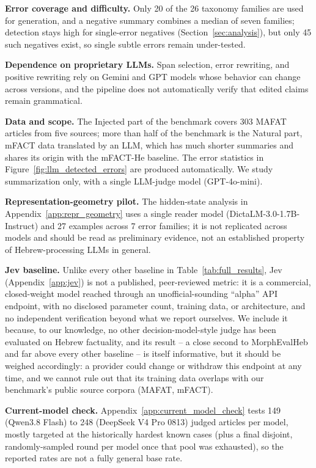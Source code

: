 \documentclass[11pt]{article}
\begin{document}
\textbf{Error coverage and difficulty.} Only 20 of the 26 taxonomy families are used for generation, and a negative summary combines a median of seven families; detection stays high for single-error negatives (Section~\ref{sec:analysis}), but only 45 such negatives exist, so single subtle errors remain under-tested.

\textbf{Dependence on proprietary LLMs.} Span selection, error rewriting, and positive rewriting rely on Gemini and GPT models whose behavior can change across versions, and the pipeline does not automatically verify that edited claims remain grammatical.

\textbf{Data and scope.} The Injected part of the benchmark covers 303 MAFAT articles from five sources; more than half of the benchmark is the Natural part, mFACT data translated by an LLM, which has much shorter summaries and shares its origin with the mFACT-He baseline. The error statistics in Figure~\ref{fig:llm_detected_errors} are produced automatically. We study summarization only, with a single LLM-judge model (GPT-4o-mini).

\textbf{Representation-geometry pilot.} The hidden-state analysis in Appendix~\ref{app:repr_geometry} uses a single reader model (DictaLM-3.0-1.7B-Instruct) and 27 examples across 7 error families; it is not replicated across models and should be read as preliminary evidence, not an established property of Hebrew-processing LLMs in general.

\textbf{Jev baseline.} Unlike every other baseline in Table~\ref{tab:full_results}, Jev (Appendix~\ref{app:jev}) is not a published, peer-reviewed metric: it is a commercial, closed-weight model reached through an unofficial-sounding ``alpha'' API endpoint, with no disclosed parameter count, training data, or architecture, and no independent verification beyond what we report ourselves. We include it because, to our knowledge, no other decision-model-style judge has been evaluated on Hebrew factuality, and its result -- a close second to MorphEvalHeb and far above every other baseline -- is itself informative, but it should be weighed accordingly: a provider could change or withdraw this endpoint at any time, and we cannot rule out that its training data overlaps with our benchmark's public source corpora (MAFAT, mFACT).

\textbf{Current-model check.} Appendix~\ref{app:current_model_check} tests 149 (Qwen3.8 Flash) to 248 (DeepSeek V4 Pro 0813) judged articles per model, mostly targeted at the historically hardest known cases (plus a final disjoint, randomly-sampled round per model once that pool was exhausted), so the reported rates are not a fully general base rate.
\end{document}
